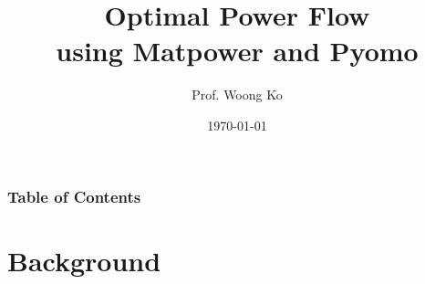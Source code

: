 \documentclass[
	11pt, %
	aspectratio=169, %
]{beamer}
\title[OPF using Matpower and Pyomo]{Optimal Power Flow \\ using Matpower and Pyomo} %
\author[Woong Ko]{Prof. Woong Ko} %
\institute[CWNU]{Changwon National University \\ \smallskip \textit{kwoong@changwon.ac.kr}} %
\date[\today]{\today} %
\begin{document}

\begin{frame}
	\titlepage %
\end{frame}



\begin{frame}[allowframebreaks]
	\frametitle{Table of Contents} %
	
	\tableofcontents %
\end{frame}


\section{Background} %
\end{document}
